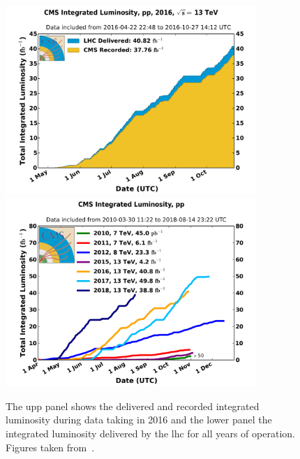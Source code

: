 \begin{figure}[htpb!]
	\centering
	\includegraphics[width=0.85\textwidth]{Figures/LHC2016Lumi} \\
	\includegraphics[width=0.85\textwidth]{Figures/LHCLumiAllYears}
	\caption[The upper panel shows the delivered and recorded integrated luminosity during data taking in 2016 and the lower panel the integrated luminosity delivered by the \acrshort{lhc} for all years of operation.]{The upp panel shows the delivered and recorded integrated luminosity during data taking in 2016 and the lower panel the integrated luminosity delivered by the \acrshort{lhc} for all years of operation. Figures taken from~\cite{CMS:CMSLumi}.}
	\label{fig:CMSLumi}
\end{figure}

